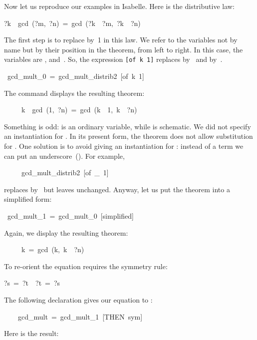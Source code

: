 Now let us reproduce our examples in Isabelle.  Here is the distributive
law:
\begin{isabelle}%
?k\ \isacharasterisk\ gcd\ (?m,\ ?n)\ =\ gcd\ (?k\ \isacharasterisk\ ?m,\ ?k\ \isacharasterisk\ ?n)
\end{isabelle}%
The first step is to replace  by~1 in this law.  We refer to the
variables not by name but by their position in the theorem, from left to
right.  In this case, the variables  are ,  and~.
So, the expression
\hbox{\texttt{[of k 1]}} replaces  by~ and 
by~.
\begin{isabelle}
\ gcd_mult_0\ =\ gcd_mult_distrib2\ [of\ k\ 1]
\end{isabelle}
%
The command 
displays the resulting theorem:
\begin{isabelle}
\ \ \ \ \ k\ \isacharasterisk\ gcd\ (1,\ ?n)\ =\ gcd\ (k\ \isacharasterisk\ 1,\ k\ \isacharasterisk\ ?n)
\end{isabelle}
Something is odd: {} is an ordinary variable, while {} 
is schematic.  We did not specify an instantiation 
for {}.  In its present form, the theorem does not allow 
substitution for {}.  One solution is to avoid giving an instantiation for
: instead of a term we can put an underscore~(\isa{_}).  For example,
\begin{isabelle}
\ \ \ \ \ gcd_mult_distrib2\ [of\ _\ 1]
\end{isabelle}
replaces  by~ but leaves  unchanged.  Anyway, let us put
the theorem  into a simplified form: 
\begin{isabelle}
\
gcd_mult_1\ =\ gcd_mult_0\
[simplified]%
\end{isabelle}
%
Again, we display the resulting theorem:
\begin{isabelle}
\ \ \ \ \ k\ =\ gcd\ (k,\ k\ \isacharasterisk\ ?n)
\end{isabelle}
%
To re-orient the equation requires the symmetry rule:
\begin{isabelle}
?s\ =\ ?t\
\isasymLongrightarrow\ ?t\ =\
?s%
\end{isabelle}
The following declaration gives our equation to \isa{sym}:
\begin{isabelle}
\ \ \ \isacommand{lemmas}\ gcd_mult\ =\ gcd_mult_1\
[THEN\ sym]
\end{isabelle}
%
Here is the result:
